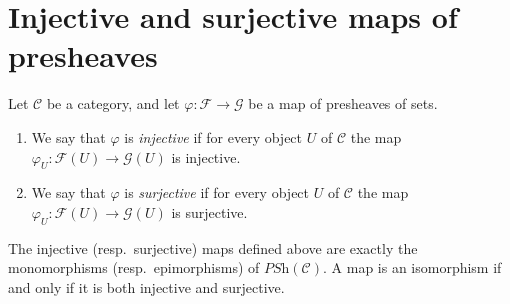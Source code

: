 \section{Injective and surjective maps of presheaves}
\label{section-injective-surjective}

\begin{definition}
\label{definition-presheaves-injective-surjective}
Let $\mathcal{C}$ be a category, and let $\varphi : \mathcal{F}
\to \mathcal{G}$ be a map of presheaves of sets.
\begin{enumerate}
\item We say that $\varphi$ is {\it injective} if for every object
$U$ of $\mathcal{C}$ the map $\varphi_U : \mathcal{F}(U)
\to \mathcal{G}(U)$ is injective.
\item We say that $\varphi$ is {\it surjective} if for every object
$U$ of $\mathcal{C}$ the map $\varphi_U : \mathcal{F}(U)
\to \mathcal{G}(U)$ is surjective.
\end{enumerate}
\end{definition}

\begin{lemma}
\label{lemma-mono-epi}
The injective (resp.\ surjective) maps defined above
are exactly the monomorphisms (resp.\ epimorphisms) of
$\textit{PSh}(\mathcal{C})$. A map is an isomorphism
if and only if it is both injective and surjective.
\end{lemma}

